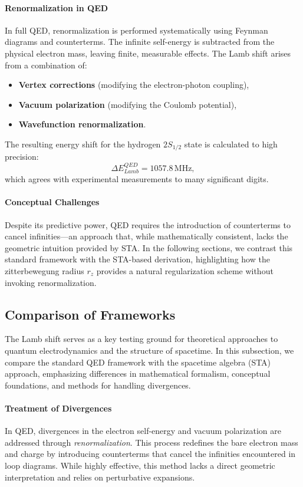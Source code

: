 \documentclass[12pt]{article}
\begin{document}
\paragraph{Renormalization in QED}
In full QED, renormalization is performed systematically using Feynman diagrams and counterterms. The infinite self-energy is subtracted from the physical electron mass, leaving finite, measurable effects. The Lamb shift arises from a combination of:
\begin{itemize}
    \item \textbf{Vertex corrections} (modifying the electron-photon coupling),
    \item \textbf{Vacuum polarization} (modifying the Coulomb potential),
    \item \textbf{Wavefunction renormalization}.
\end{itemize}
The resulting energy shift for the hydrogen \(2S_{1/2}\) state is calculated to high precision:
\[
\Delta E_{Lamb}^{QED} = 1057.8\,\mathrm{MHz},
\]
which agrees with experimental measurements to many significant digits.

\paragraph{Conceptual Challenges}
Despite its predictive power, QED requires the introduction of counterterms to cancel infinities—an approach that, while mathematically consistent, lacks the geometric intuition provided by STA. In the following sections, we contrast this standard framework with the STA-based derivation, highlighting how the zitterbewegung radius \(r_z\) provides a natural regularization scheme without invoking renormalization.



\subsection{Comparison of Frameworks}\label{subsec:framework_comparison}

The Lamb shift serves as a key testing ground for theoretical approaches to quantum electrodynamics and the structure of spacetime. In this subsection, we compare the standard QED framework with the spacetime algebra (STA) approach, emphasizing differences in mathematical formalism, conceptual foundations, and methods for handling divergences.

\paragraph{Treatment of Divergences}
In QED, divergences in the electron self-energy and vacuum polarization are addressed through \emph{renormalization}. This process redefines the bare electron mass and charge by introducing counterterms that cancel the infinities encountered in loop diagrams. While highly effective, this method lacks a direct geometric interpretation and relies on perturbative expansions.
\end{document}
